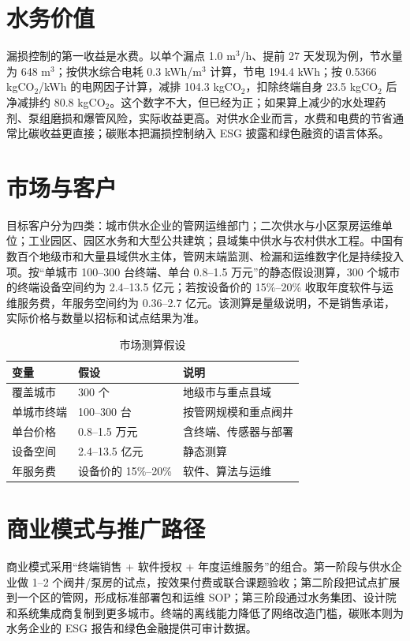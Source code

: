 \documentclass[lang=cn,11pt,scheme=chinese,chinesefont=nofont,color=green]{elegantbook}
\begin{document}
\section{水务价值}

漏损控制的第一收益是水费。以单个漏点 1.0 m\(^3\)/h、提前 27 天发现为例，节水量为 648 m\(^3\)；按供水综合电耗 0.3 kWh/m\(^3\) 计算，节电 194.4 kWh；按 0.5366 kgCO\(_2\)/kWh 的电网因子计算，减排 104.3 kgCO\(_2\)，扣除终端自身 23.5 kgCO\(_2\) 后净减排约 80.8 kgCO\(_2\)。这个数字不大，但已经为正；如果算上减少的水处理药剂、泵组磨损和爆管风险，实际收益更高。对供水企业而言，水费和电费的节省通常比碳收益更直接；碳账本把漏损控制纳入 ESG 披露和绿色融资的语言体系。

\section{市场与客户}

目标客户分为四类：城市供水企业的管网运维部门；二次供水与小区泵房运维单位；工业园区、园区水务和大型公共建筑；县域集中供水与农村供水工程。中国有数百个地级市和大量县域供水主体，管网末端监测、检漏和运维数字化是持续投入项。按“单城市 100--300 台终端、单台 0.8--1.5 万元”的静态假设测算，300 个城市的终端设备空间约为 2.4--13.5 亿元；若按设备价的 15\%--20\% 收取年度软件与运维服务费，年服务空间约为 0.36--2.7 亿元。该测算是量级说明，不是销售承诺，实际价格与数量以招标和试点结果为准。

\begin{table}[htbp]
\centering
\small
\caption{市场测算假设}
\label{tab:market}
\begin{tabular}{p{4.2cm}p{5.6cm}p{4.0cm}}
\toprule
变量 & 假设 & 说明 \\
\midrule
覆盖城市 & 300 个 & 地级市与重点县域 \\
单城市终端 & 100--300 台 & 按管网规模和重点阀井 \\
单台价格 & 0.8--1.5 万元 & 含终端、传感器与部署 \\
设备空间 & 2.4--13.5 亿元 & 静态测算 \\
年服务费 & 设备价的 15\%--20\% & 软件、算法与运维 \\
\bottomrule
\end{tabular}
\end{table}

\section{商业模式与推广路径}

商业模式采用“终端销售 + 软件授权 + 年度运维服务”的组合。第一阶段与供水企业做 1--2 个阀井/泵房的试点，按效果付费或联合课题验收；第二阶段把试点扩展到一个区的管网，形成标准部署包和运维 SOP；第三阶段通过水务集团、设计院和系统集成商复制到更多城市。终端的离线能力降低了网络改造门槛，碳账本则为水务企业的 ESG 报告和绿色金融提供可审计数据。
\end{document}
